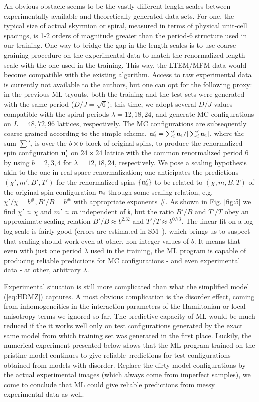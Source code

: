 \documentclass[reprint,amsmath,amssymb,aps,showpacs,superscriptaddress,prb]{revtex4-1}
\renewcommand{\v}[1]{{\bf #1}}
\begin{document}
An obvious obstacle seems to be the vastly different length scales between experimentally-available and theoretically-generated data sets. For one, the typical size of actual skyrmion or spiral, measured in terms of physical unit-cell spacings, is 1-2 orders of magnitude greater than the period-6 structure used in our training. One way to bridge the gap in the length scales is to use coarse-graining procedure on the experimental data to match the renormalized length scale with the one used in the training. This way, the LTEM/MFM data would become compatible with the existing algorithm. Access to raw experimental data is currently not available to the authors, but one can opt for the following  proxy: in the previous ML tryouts, both the training and the test sets were generated with the same period ($D/J=\sqrt{6}$); this time, we adopt several $D/J$ values compatible with the spiral periods $\lambda=12, 18, 24$, and generate MC configurations on $L=48, 72, 96$ lattices, respectively. The MC configurations are subsequently coarse-grained according to the simple scheme, $\v n'_i = \sum'_i \v n_i / | \sum'_i \v n_i  |$, where the sum $\sum'_i$ is over the $b\times b$ block of original spins, to produce the renormalized spin configuration $\v n'_i$ on $24\times24$ lattice with the common renormalized period 6 by using $b=2,3,4$ for $\lambda=12, 18, 24$, respectively. We pose a scaling hypothesis akin to the one in real-space renormalization; one anticipates the predictions $(\chi',  m',  B' , T')$ for the renormalized spins $\{ \v n'_i \}$ to be related to $(\chi, m, B, T)$ of the original spin configuration $\v n_i$ through some scaling relation, e.g. $\chi'/\chi = b^{\#}, B'/B = b^{\#}$ with appropriate exponents $\#$. As shown in Fig. \ref{fig:5} we find $\chi' \approx \chi$ and $m' \approx m$ independent of $b$, but the ratio  $B'/B$  and $T'/T$ obey an approximate scaling relation $B'/B \approx b^{2.32}$ and $T'/T \approx b^{0.73}$. The linear fit on a log-log scale is fairly good (errors are estimated in SM~\cite{SM}), which brings us to suspect that scaling should work even at other, non-integer values of $b$. It means that even with just one period $\lambda$ used in the training, the ML program is capable of producing reliable predictions for MC configurations - and even experimental data - at other, arbitrary  $\lambda$.

Experimental situation is still more complicated than what the simplified model (\ref{eq:HDMZ}) captures. A most obvious complication is the disorder effect, coming from inhomogeneities in the interaction parameters of the Hamiltonian or local anisotropy terms we ignored so far. The predictive capacity of ML would be much reduced if the it works well only on test  configurations generated by the exact same model from which training set was generated in the first place. Luckily, the numerical experiment presented below shows that the ML program trained on the pristine model continues to give reliable predictions for test configurations obtained from models with disorder. Replace the dirty model configurations by the actual experimental images (which always come from imperfect samples), we come to conclude that ML could give reliable predictions from messy experimental data as well.
\end{document}
